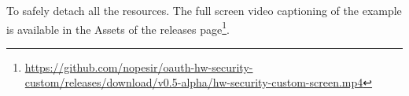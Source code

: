\noindent To safely detach all the resources.
The full screen video captioning of the example is available in the Assets of the releases page\footnote{\scriptsize{\url{https://github.com/nopesir/oauth-hw-security-custom/releases/download/v0.5-alpha/hw-security-custom-screen.mp4}}}. 


